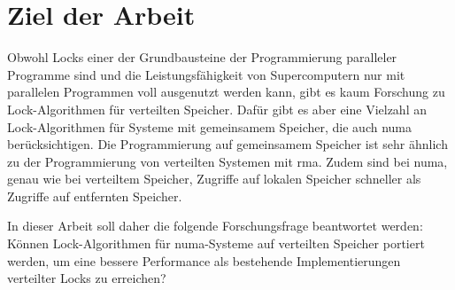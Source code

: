 \section{Ziel der Arbeit}
\label{sec:ziel}

Obwohl Locks einer der Grundbausteine der Programmierung paralleler Programme sind
und die Leistungsfähigkeit von Supercomputern nur mit parallelen Programmen voll ausgenutzt werden kann,
gibt es kaum Forschung zu Lock-Algorithmen für verteilten Speicher.
Dafür gibt es aber eine Vielzahl an Lock-Algorithmen für Systeme mit gemeinsamem Speicher,
die auch \gls{numa} berücksichtigen.
Die Programmierung auf gemeinsamem Speicher ist sehr ähnlich
zu der Programmierung von verteilten Systemen mit \gls{rma}.
Zudem sind bei \gls{numa},
genau wie bei verteiltem Speicher,
Zugriffe auf lokalen Speicher schneller
als Zugriffe auf entfernten Speicher.

In dieser Arbeit soll daher die folgende Forschungsfrage beantwortet werden:
Können Lock-Algorithmen für \gls{numa}-Systeme auf verteilten Speicher portiert werden,
um eine bessere Performance als bestehende Implementierungen verteilter Locks zu erreichen?
